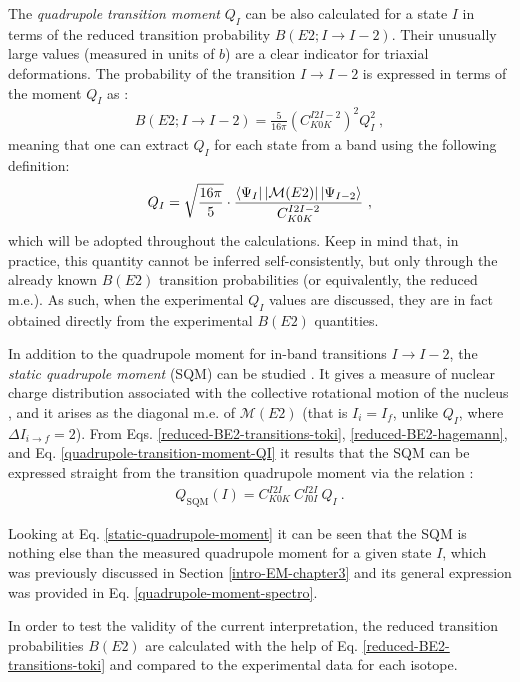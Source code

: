 The \emph{quadrupole transition moment} $Q_I$ can be also calculated for a state $I$ in terms of the reduced transition probability $B(E2; I\to I-2)$. Their unusually large values (measured in units of $b$) are a clear indicator for triaxial deformations. The probability of the transition $I\to I-2$ is expressed in terms of the moment $Q_I$ as \cite{hagemann1984signature}:
\begin{align}
    B(E2;I\to I-2)=\frac{5}{16\pi}(C_{K0K}^{I2I-2})^2Q_I^2\ , 
    \label{reduced-BE2-hagemann}
\end{align}
meaning that one can extract $Q_I$ for each state from a band using the following definition:
\begin{align}
    Q_I=\sqrt{\frac{16\pi}{5}}\cdot\frac{\bra{\Psi_{I}}|\mathcal{M}(E2)|\ket{\Psi_{I-2}}}{C_{K0K}^{I2I-2}}\ ,
    \label{quadrupole-transition-moment-QI}
\end{align}
which will be adopted throughout the calculations. Keep in mind that, in practice, this quantity cannot be inferred self-consistently, but only through the already known $B(E2)$ transition probabilities (or equivalently, the reduced m.e.). As such, when the experimental $Q_I$ values are discussed, they are in fact obtained directly from the experimental $B(E2)$ quantities.

In addition to the quadrupole moment for in-band transitions $I \to I-2$, the \emph{static quadrupole moment} (SQM) can be studied \cite{bohr1998nuclear}. It gives a measure of nuclear charge distribution associated with the collective rotational motion of the nucleus \cite{chen2020g,chen2020static}, and it arises as the diagonal m.e. of $\mathcal{M}(E2)$ (that is $I_i=I_f$, unlike $Q_I$, where $\Delta I_{i\to f}=2$). From Eqs. \ref{reduced-BE2-transitions-toki}, \ref{reduced-BE2-hagemann}, and Eq. \ref{quadrupole-transition-moment-QI} it results that the SQM can be expressed straight from the transition quadrupole moment via the relation \cite{bohr1998nuclear}:
\begin{align}
    Q_\text{SQM}(I)=C_{K0K}^{I2I}\ C_{I0I}^{I2I}\ Q_I\ .
    \label{static-quadrupole-moment}
\end{align}

Looking at Eq. \ref{static-quadrupole-moment} it can be seen that the SQM is nothing else than the measured quadrupole moment for a given state $I$, which was previously discussed in Section \ref{intro-EM-chapter3} and its general expression was provided in Eq. \ref{quadrupole-moment-spectro}.

In order to test the validity of the current interpretation, the reduced transition probabilities $B(E2)$ are calculated with the help of Eq. \ref{reduced-BE2-transitions-toki} and compared to the experimental data for each isotope.

